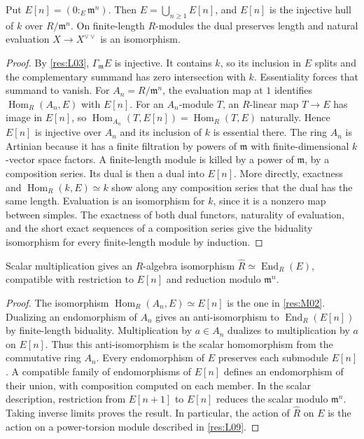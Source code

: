 \begin{proposition}\label{res:M02}
Put $E[n]=(0:_E\mathfrak m^n)$. Then $E=\bigcup_{n\ge1}E[n]$,
and $E[n]$ is the injective hull of $k$ over $R/\mathfrak m^n$.
On finite-length $R$-modules the dual preserves length and natural
evaluation $X\to X^{\vee\vee}$ is an isomorphism.
\end{proposition}
\begin{proof}
By \ref{res:L03}, $\Gamma_{\mathfrak m}E$ is injective. It contains $k$,
so its inclusion in $E$ splits and the complementary summand has zero
intersection with $k$. Essentiality forces that summand to vanish.
For $A_n=R/\mathfrak m^n$, the evaluation map at $1$ identifies
$\operatorname{Hom}_R(A_n,E)$ with $E[n]$. For an $A_n$-module $T$,
an $R$-linear map $T\to E$ has image in $E[n]$, so
$\operatorname{Hom}_{A_n}(T,E[n])=\operatorname{Hom}_R(T,E)$ naturally.
Hence $E[n]$ is injective over $A_n$ and its inclusion of $k$ is
essential there. The ring $A_n$ is Artinian because it has a finite
filtration by powers of $\mathfrak m$ with finite-dimensional
$k$-vector space factors. A finite-length module is killed by a power
of $\mathfrak m$, by a composition series. Its dual is then a dual into
$E[n]$. More directly, exactness and $\operatorname{Hom}_R(k,E)\simeq k$
show along any composition series that the dual has the same length.
Evaluation is an isomorphism for $k$, since it is a nonzero map between
simples. The exactness of both dual functors, naturality of evaluation,
and the short exact sequences of a composition series give the
biduality isomorphism for every finite-length module by induction.
\end{proof}

\begin{theorem}\label{res:M03}
Scalar multiplication gives an $R$-algebra isomorphism
$\widehat R\simeq \operatorname{End}_R(E)$, compatible with
restriction to $E[n]$ and reduction modulo $\mathfrak m^n$.
\end{theorem}
\begin{proof}
The isomorphism $\operatorname{Hom}_R(A_n,E)\simeq E[n]$ is the one
in \ref{res:M02}. Dualizing an endomorphism of $A_n$ gives an
anti-isomorphism to $\operatorname{End}_R(E[n])$ by finite-length
biduality. Multiplication by $a\in A_n$ dualizes to multiplication by
$a$ on $E[n]$. Thus this anti-isomorphism is the scalar homomorphism
from the commutative ring $A_n$. Every endomorphism of $E$ preserves
each submodule $E[n]$. A compatible family of endomorphisms of $E[n]$
defines an endomorphism of their union, with composition computed on
each member. In the scalar description, restriction from $E[n+1]$
to $E[n]$ reduces the scalar modulo $\mathfrak m^n$. Taking inverse
limits proves the result. In particular, the action of $\widehat R$
on $E$ is the action on a power-torsion module described in
\ref{res:L09}.
\end{proof}

